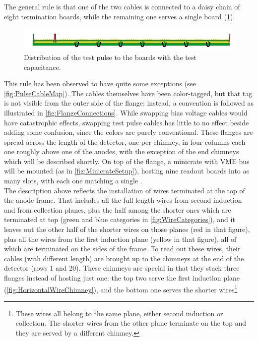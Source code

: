 The general rule is that one of the two cables is connected to a daisy chain of
eight termination boards, while the remaining one serves a single board
(\cref{fig:TestPulseDistribution}).
\begin{figure}
  \includegraphics[width=\textwidth]{fig/TerminatorDaisyChain}
  \caption{\label{fig:TestPulseDistribution}
    Distribution of the test pulse to the boards with the test capacitance.
  }
\end{figure}
This rule has been observed to have quite some exceptions (see
\cref{fig:PulseCableMap}).
The cables themselves have been color-tagged, but that tag is not visible from
the outer side of the flange: instead, a convention is followed as illustrated
in \cref{fig:FlangeConnections}.
While swapping bias voltage cables would have catastrophic effects, swapping
test pulse cables has little to no effect beside adding some confusion, since
the colors are purely conventional.
These flanges are spread across the length of the detector, one per chimney,
in four columns each one roughly above one of the anodes, with the exception
of the end chimneys which will be described shortly.
On top of the flange, a minicrate with VME bus will be mounted
(as in \cref{fig:MinicrateSetup}), hosting nine readout boards into as many
slots, with each one matching a single \DBB.
\\
The description above reflects the installation of wires terminated at the top
of the anode frame.
That includes all the full length wires from second induction and from
collection planes, plus the half among the shorter ones which are terminated at
top (green and blue categories in \cref{fig:WireCategories}), and it leaves out
the other half of the shorter wires on those planes (red in that figure), plus
all the wires from the first induction plane (yellow in that figure), 
all of which are terminated on the sides of the frame.
To read out these wires, their cables (with different length) are brought up to
the chimneys at the end of the detector (rows 1 and 20).
These chimneys are special in that they stack three flanges instead of hosting
just one: the top two serve the first induction plane
(\cref{fig:HorizontalWireChimney}), and the bottom one serves the shorter
wires\footnote{%
These wires all belong to the same plane, either second induction or collection.
The shorter wires from the other plane terminate on the top and they are served
by a different chimney.
}
